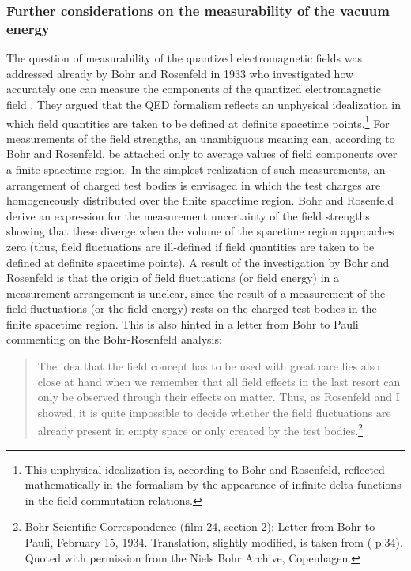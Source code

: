 \documentclass[12pt]{article}
\def\sss{\subsubsection}
\begin{document}
\sss{Further considerations on the measurability of the vacuum energy}

The question of measurability of the quantized electromagnetic fields
was addressed already by Bohr and Rosenfeld in 1933 who investigated
how accurately one can measure the components of the quantized
electromagnetic field \cite{bohr33}. They argued that the QED
formalism reflects an unphysical idealization in which field
quantities are taken to be defined at definite spacetime
points.\footnote{This unphysical idealization is, according to Bohr
and Rosenfeld, reflected mathematically in the formalism by the
appearance of infinite delta functions in the field commutation
relations.}  For measurements of the field strengths, an unambiguous
meaning can, according to Bohr and Rosenfeld, be attached only to
average values of field components over a finite spacetime region.
In the simplest realization of such measurements, an arrangement of
charged test bodies is envisaged in which the test charges are
homogeneously distributed over the finite spacetime region.  Bohr and
Rosenfeld derive an expression for the measurement uncertainty of the
field strengths showing that these diverge when the volume of the
spacetime region approaches zero (thus, field fluctuations are
ill-defined if field quantities are taken to be defined at definite
spacetime points).  A result of the investigation by Bohr and
Rosenfeld is that the origin of field fluctuations (or field energy)
in a measurement arrangement is unclear, since the result of a
measurement of the field fluctuations (or the field energy) rests on
the charged test bodies in the finite spacetime region. This is also
hinted in a letter from Bohr to Pauli commenting on the Bohr-Rosenfeld
analysis:

\begin{quote}
The idea that the field concept has to be used with
great care lies also close at hand when we remember that all field
effects in the last resort can only be observed through their effects
on matter. Thus, as Rosenfeld and I showed, it is quite impossible
to decide whether the field fluctuations are already present in 
empty space or only created by the test 
bodies.\footnote{Bohr Scientific Correspondence (film 24, section 2):
Letter from Bohr to Pauli, February 15, 1934. Translation, slightly 
modified, is taken from (\cite{kalckar96} p.34). Quoted with permission
from the Niels Bohr Archive, Copenhagen.}
\end{quote}
\end{document}
